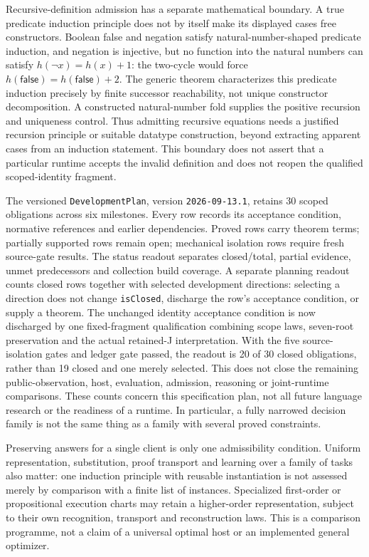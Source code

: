 \documentclass[11pt]{article}
\theoremstyle{definition}
\theoremstyle{remark}
\begin{document}
Recursive-definition admission has a separate mathematical boundary. A true
predicate induction principle does not by itself make its displayed cases free
constructors. Boolean false and negation satisfy natural-number-shaped
predicate induction, and negation is injective, but no function into the
natural numbers can satisfy \(h(\neg x)=h(x)+1\): the two-cycle would force
\(h(\mathsf{false})=h(\mathsf{false})+2\). The generic theorem characterizes
this predicate induction precisely by finite successor reachability, not
unique constructor decomposition. A constructed natural-number fold supplies
the positive recursion and uniqueness control. Thus admitting recursive
equations needs a justified recursion principle or suitable datatype
construction, beyond extracting apparent cases from an induction statement.
This boundary does not assert that a particular runtime accepts the invalid
definition and does not reopen the qualified scoped-identity fragment.

The versioned \texttt{DevelopmentPlan}, version \texttt{2026-09-13.1}, retains
30 scoped obligations across six milestones. Every row records its acceptance
condition, normative references and earlier dependencies. Proved rows carry
theorem terms; partially supported rows remain open; mechanical isolation rows
require fresh source-gate results. The status readout separates closed/total,
partial evidence, unmet predecessors and collection build coverage. A separate
planning readout counts closed rows together with selected development
directions: selecting a direction does not change \texttt{isClosed}, discharge
the row's acceptance condition, or supply a theorem. The unchanged identity
acceptance condition is now discharged by one fixed-fragment qualification
combining scope laws, seven-root preservation and the actual retained-J
interpretation. With the five source-isolation gates and ledger gate passed,
the readout is 20 of 30 closed obligations, rather than 19 closed and one merely
selected. This does not close the remaining public-observation, host,
evaluation, admission, reasoning or joint-runtime comparisons. These
counts concern this specification plan, not all future language research or
the readiness of a runtime. In particular, a fully narrowed decision family
is not the same thing as a family with several proved constraints.

Preserving answers for a single client is only one admissibility condition.
Uniform representation, substitution, proof transport and learning over a
family of tasks also matter: one induction principle with reusable
instantiation is not assessed merely by comparison with a finite list of
instances. Specialized first-order or propositional execution charts may
retain a higher-order representation, subject to their own recognition,
transport and reconstruction laws. This is a comparison programme, not a
claim of a universal optimal host or an implemented general optimizer.
\end{document}
